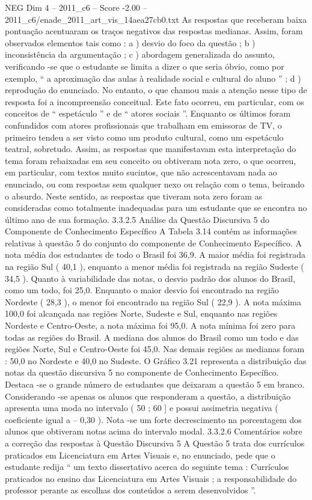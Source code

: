 \begin{textsample}{NEG Dim 4 – 2011\_c6 – Score -2.00 – 2011\_c6/enade\_2011\_art\_vis\_14aea27cb0.txt}
As respostas que receberam baixa pontuação acentuaram os traços negativos das respostas medianas.
Assim, foram observados elementos tais como : a ) desvio do foco da questão ; b ) inconsistência da argumentação ; c ) abordagem generalizada do assunto, verificando -se que o estudante se limita a dizer o que seria óbvio, como por exemplo, “ a aproximação das aulas à realidade social e cultural do aluno ” ; d ) reprodução do enunciado.
No entanto, o que chamou mais a atenção nesse tipo de resposta foi a incompreensão conceitual.
Este fato ocorreu, em particular, com os conceitos de “ espetáculo ” e de “ atores sociais ”.
Enquanto os últimos foram confundidos com atores profissionais que trabalham em emissoras de TV, o primeiro tendeu a ser visto como um produto cultural, como um espetáculo teatral, sobretudo.
Assim, as respostas que manifestavam esta interpretação do tema foram rebaixadas em seu conceito ou obtiveram nota zero, o que ocorreu, em particular, com textos muito sucintos, que não acrescentavam nada ao enunciado, ou com respostas sem qualquer nexo ou relação com o tema, beirando o absurdo.
Neste sentido, as respostas que tiveram nota zero foram as consideradas como totalmente inadequadas para um estudante que se encontra no último ano de sua formação. 3.3.2.5 Análise da Questão Discursiva 5 do Componente de Conhecimento Específico A Tabela 3.14 contém as informações relativas à questão 5 do conjunto do componente de Conhecimento Específico.
A nota média dos estudantes de todo o Brasil foi 36,9.
A maior média foi registrada na região Sul ( 40,1 ), enquanto a menor média foi registrada na região Sudeste ( 34,5 ).
Quanto à variabilidade das notas, o desvio padrão dos alunos do Brasil, como um todo, foi 25,0.
Enquanto o maior desvio foi encontrado na região Nordeste ( 28,3 ), o menor foi encontrado na região Sul ( 22,9 ).
A nota máxima 100,0 foi alcançada nas regiões Norte, Sudeste e Sul, enquanto nas regiões Nordeste e Centro-Oeste, a nota máxima foi 95,0.
A nota mínima foi zero para todas as regiões do Brasil.
A mediana dos alunos do Brasil como um todo e das regiões Norte, Sul e Centro-Oeste foi 45,0.
Nas demais regiões as medianas foram : 50,0 no Nordeste e 40,0 no Sudeste.
O Gráfico 3.21 representa a distribuição das notas da questão discursiva 5 no componente de Conhecimento Específico.
Destaca -se o grande número de estudantes que deixaram a questão 5 em branco.
Considerando -se apenas os alunos que responderam a questão, a distribuição apresenta uma moda no intervalo ( 50 ; 60 ] e possui assimetria negativa ( coeficiente igual a – 0,30 ).
Nota -se um forte decrescimento na porcentagem dos alunos que obtiveram notas acima do intervalo modal. 3.3.2.6 Comentários sobre a correção das respostas à Questão Discursiva 5 A Questão 5 trata dos currículos praticados em Licenciatura em Artes Visuais e, no enunciado, pede que o estudante redija “ um texto dissertativo acerca do seguinte tema : Currículos praticados no ensino das Licenciatura em Artes Visuais ; a responsabilidade do professor perante as escolhas dos conteúdos a serem desenvolvidos ”.

\end{textsample}
